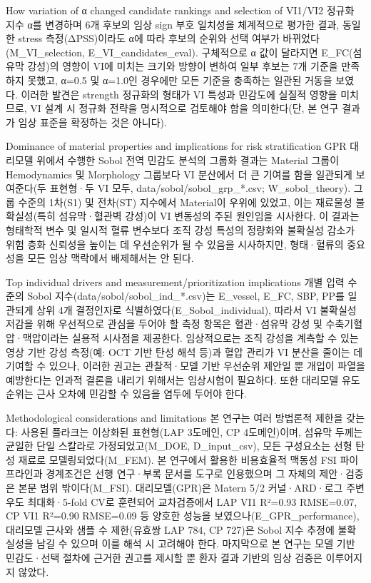 \documentclass[preprint,12pt]{elsarticle}
\begin{document}
How variation of α changed candidate rankings and selection of VI1/VI2
정규화 지수 α를 변경하며 6개 후보의 임상 sign 부호 일치성을 체계적으로 평가한 결과, 동일한 stress 측정(ΔPSS)이라도 α에 따라 후보의 순위와 선택 여부가 바뀌었다(M\_VI\_selection, E\_VI\_candidates\_eval). 구체적으로 α 값이 달라지면 E\_FC(섬유막 강성)의 영향이 VI에 미치는 크기와 방향이 변하여 일부 후보는 7개 기준을 만족하지 못했고, α=0.5 및 α=1.0인 경우에만 모든 기준을 충족하는 일관된 거동을 보였다. 이러한 발견은 strength 정규화의 형태가 VI 특성과 민감도에 실질적 영향을 미치므로, VI 설계 시 정규화 전략을 명시적으로 검토해야 함을 의미한다(단, 본 연구 결과가 임상 표준을 확정하는 것은 아니다).

Dominance of material properties and implications for risk stratification
GPR 대리모델 위에서 수행한 Sobol 전역 민감도 분석의 그룹화 결과는 Material 그룹이 Hemodynamics 및 Morphology 그룹보다 VI 분산에서 더 큰 기여를 함을 일관되게 보여준다(두 표현형·두 VI 모두, data/sobol/sobol\_grp\_*.csv; W\_sobol\_theory). 그룹 수준의 1차(S1) 및 전차(ST) 지수에서 Material이 우위에 있었고, 이는 재료물성 불확실성(특히 섬유막·혈관벽 강성)이 VI 변동성의 주된 원인임을 시사한다. 이 결과는 형태학적 변수 및 일시적 혈류 변수보다 조직 강성 특성의 정량화와 불확실성 감소가 위험 층화 신뢰성을 높이는 데 우선순위가 될 수 있음을 시사하지만, 형태·혈류의 중요성을 모든 임상 맥락에서 배제해서는 안 된다.

Top individual drivers and measurement/prioritization implications
개별 입력 수준의 Sobol 지수(data/sobol/sobol\_ind\_*.csv)는 E\_vessel, E\_FC, SBP, PP를 일관되게 상위 4개 결정인자로 식별하였다(E\_Sobol\_individual), 따라서 VI 불확실성 저감을 위해 우선적으로 관심을 두어야 할 측정 항목은 혈관·섬유막 강성 및 수축기혈압·맥압이라는 실용적 시사점을 제공한다. 임상적으로는 조직 강성을 계측할 수 있는 영상 기반 강성 측정(예: OCT 기반 탄성 해석 등)과 혈압 관리가 VI 분산을 줄이는 데 기여할 수 있으나, 이러한 권고는 관찰적·모델 기반 우선순위 제안일 뿐 개입이 파열을 예방한다는 인과적 결론을 내리기 위해서는 임상시험이 필요하다. 또한 대리모델 유도 순위는 근사 오차에 민감할 수 있음을 염두에 두어야 한다.

Methodological considerations and limitations
본 연구는 여러 방법론적 제한을 갖는다: 사용된 플라크는 이상화된 표현형(LAP 3도메인, CP 4도메인)이며, 섬유막 두께는 균일한 단일 스칼라로 가정되었고(M\_DOE, D\_input\_csv), 모든 구성요소는 선형 탄성 재료로 모델링되었다(M\_FEM). 본 연구에서 활용한 비용효율적 맥동성 FSI 파이프라인과 경계조건은 선행 연구·부록 문서를 도구로 인용했으며 그 자체의 제안·검증은 본문 범위 밖이다(M\_FSI). 대리모델(GPR)은 Matern 5/2 커널·ARD·로그 주변우도 최대화·5-fold CV로 훈련되어 교차검증에서 LAP VI1 R²=0.93 RMSE=0.07, CP VI1 R²=0.90 RMSE=0.09 등 양호한 성능을 보였으나(E\_GPR\_performance), 대리모델 근사와 샘플 수 제한(유효쌍 LAP 784, CP 727)은 Sobol 지수 추정에 불확실성을 남길 수 있으며 이를 해석 시 고려해야 한다. 마지막으로 본 연구는 모델 기반 민감도·선택 절차에 근거한 권고를 제시할 뿐 환자 결과 기반의 임상 검증은 이루어지지 않았다.
\end{document}
